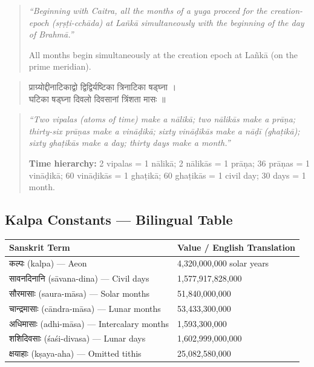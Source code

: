 \documentclass[11pt,a4paper]{article}
\newcommand{\dev}[1]{{\devanagarifont #1}}
\theoremstyle{definition}
\begin{document}
\hfill\noindent
\begin{quote}
\textit{``Beginning with Caitra, all the months of a yuga proceed for the creation-epoch (s\d{r}\d{s}\d{t}i-cch\=ada) at La\~nk\=a simultaneously with the beginning of the day of Brahm\=a.''}

All months begin simultaneously at the creation epoch at La\~nk\=a (on the prime meridian).
\end{quote}

\noindent
\begin{quote}
\dev{प्राग्र्योद्दीनाटिकाद्वो द्विद्विर्यष्टिका त्रिनाटिका षड्घ्ना ।\\
घटिका षड्घ्ना दिवलो दिवसानां त्रिंशता मासः ॥}
\end{quote}

\hfill\noindent
\begin{quote}
\textit{``Two vipalas (atoms of time) make a n\=alik\=a; two n\=alik\=as make a pr\=a\d{n}a; thirty-six pr\=a\d{n}as make a vin\=a\d{d}ik\=a; sixty vin\=a\d{d}ik\=as make a n\=a\d{d}\={i} (gha\d{t}ik\=a); sixty gha\d{t}ik\=as make a day; thirty days make a month.''}

\textbf{Time hierarchy:} 2 vipalas = 1 n\=alik\=a; 2 n\=alik\=as = 1 pr\=a\d{n}a; 36 pr\=a\d{n}as = 1 vin\=a\d{d}ik\=a; 60 vin\=a\d{d}ik\=as = 1 gha\d{t}ik\=a; 60 gha\d{t}ik\=as = 1 civil day; 30 days = 1 month.
\end{quote}



\subsection*{Kalpa Constants --- Bilingual Table}

\begin{longtable}{p{}p{}}
\toprule
\textbf{Sanskrit Term} & \textbf{Value / English Translation} \\
\midrule
\endhead
\dev{कल्पः} (kalpa) --- Aeon & 4,320,000,000 solar years \\
\dev{सावनदिनानि} (s\=avana-dina) --- Civil days & 1,577,917,828,000 \\
\dev{सौरमासाः} (saura-m\=asa) --- Solar months & 51,840,000,000 \\
\dev{चान्द्रमासाः} (c\=andra-m\=asa) --- Lunar months & 53,433,300,000 \\
\dev{अधिमासाः} (adhi-m\=asa) --- Intercalary months & 1,593,300,000 \\
\dev{शशिदिवसाः} ({\'{s}}a\'{s}i-divasa) --- Lunar days & 1,602,999,000,000 \\
\dev{क्षयाहाः} (k\d{s}aya-aha) --- Omitted tithis & 25,082,580,000 \\
\bottomrule
\end{longtable}
\end{document}
